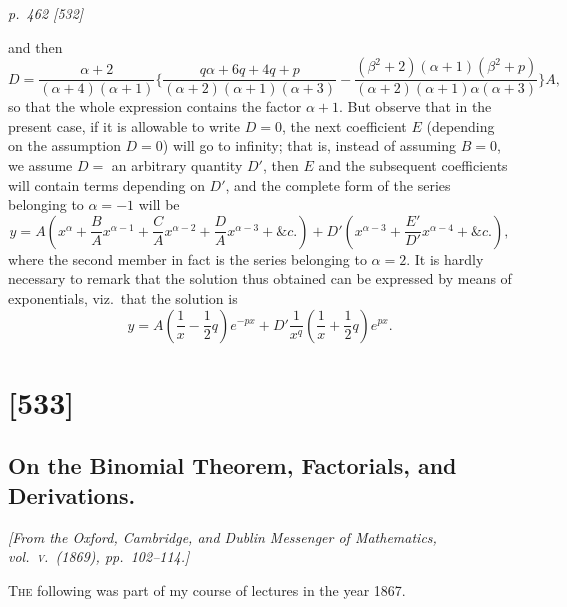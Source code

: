 \documentclass[11pt,a4paper]{book}
\begin{document}
\clearpage

\bigskip
\textit{p.~462 [532]}
\smallskip

and then
\[
D = \dfrac{\alpha + 2}{(\alpha + 4)(\alpha + 1)}\Big\{\dfrac{q\alpha + 6q + 4q + p}{(\alpha + 2)(\alpha + 1)(\alpha + 3)} - \dfrac{(\beta^2 + 2)(\alpha + 1)(\beta^2 + p)}{(\alpha + 2)(\alpha + 1)\alpha(\alpha + 3)}\Big\}A,
\]
so that the whole expression contains the factor $\alpha + 1$. But observe that in the
present case, if it is allowable to write $D = 0$, the next coefficient $E$ (depending on
the assumption $D = 0$) will go to infinity; that is, instead of assuming $B = 0$, we
assume $D = $ an arbitrary quantity $D'$, then $E$ and the subsequent coefficients will
contain terms depending on $D'$, and the complete form of the series belonging to
$\alpha = -1$ will be
\[
y = A\left(x^\alpha + \frac{B}{A}x^{\alpha-1} + \frac{C}{A}x^{\alpha-2} + \frac{D}{A}x^{\alpha-3} + \&c.\right) + D'\left(x^{\alpha-3} + \frac{E'}{D'}x^{\alpha-4} + \&c.\right),
\]
where the second member in fact is the series belonging to $\alpha = 2$. It is hardly
necessary to remark that the solution thus obtained can be expressed by means of
exponentials, viz.\ that the solution is
\[
y = A\left(\frac{1}{x} - \frac{1}{2}q\right)e^{-px} + D'\frac{1}{x^q}\left(\frac{1}{x} + \frac{1}{2}q\right)e^{px}.
\]

\clearpage

\section{[533]}
\subsection{On the Binomial Theorem, Factorials, and Derivations.}

\begin{center}
\textit{[From the Oxford, Cambridge, and Dublin Messenger of Mathematics, vol.~\textsc{v}.\ (1869), pp.~102--114.]}
\end{center}

\textsc{The} following was part of my course of lectures in the year 1867.
\end{document}

